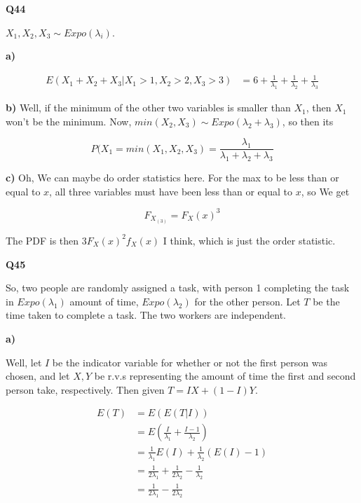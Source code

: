 \documentclass{article}
\begin{document}
			\hfill
			
		\textbf{Q44}
		
			$X_1, X_2, X_3\sim Expo(\lambda_i)$.
			
			\textbf{a)}
			
			\begin{align*}
			E(X_1+X_2+X_3|X_1>1, X_2>2, X_3>3) &= 6 + \frac{1}{\lambda_1} + \frac{1}{\lambda_2} + \frac{1}{\lambda_3}
			\end{align*}
			
			\textbf{b)} Well, if the minimum of the other two variables is smaller than $X_1$, then $X_1$ won't be the minimum. Now, $min(X_2, X_3)\sim Expo(\lambda_2 + \lambda_3)$, so then its
			
			\[P(X_1 = min(X_1, X_2, X_3) = \frac{\lambda_1}{\lambda_1 + \lambda_2 + \lambda_3} \]
			
			\textbf{c)} Oh, We can maybe do order statistics here. For the max to be less than or equal to $x$, all three variables must have been less than or equal to $x$, so We get
			
			\[ F_{X_{(3)}} = F_X(x)^3\]
			
			The PDF is then $3F_X(x)^2f_X(x)$ I think, which is just the order statistic.
			
			\hfill
			
		\textbf{Q45}
		
			So, two people are randomly assigned a task, with person 1 completing the task in $Expo(\lambda_1)$ amount of time, $Expo(\lambda_2)$ for the other person. Let $T$ be the time taken to complete a task. The two workers are independent.
			
			\textbf{a)}
			
			Well, let $I$ be the indicator variable for whether or not the first person was chosen, and let $X, Y$ be r.v.s representing the amount of time the first and second person take, respectively. Then given $T = IX + (1-I)Y$.
			
			\begin{align*}
			E(T) &= E(E(T|I))\\
			&= E\left( \frac{I}{\lambda_1} + \frac{I-1}{\lambda_2} \right)\\
			&= \frac{1}{\lambda_1}E(I) + \frac{1}{\lambda_2}(E(I)-1)\\
			&= \frac{1}{2\lambda_1} + \frac{1}{2\lambda_2} - \frac{1}{\lambda_2}\\
			&= \frac{1}{2\lambda_1} - \frac{1}{2\lambda_2}
			\end{align*}
			
\end{document}
